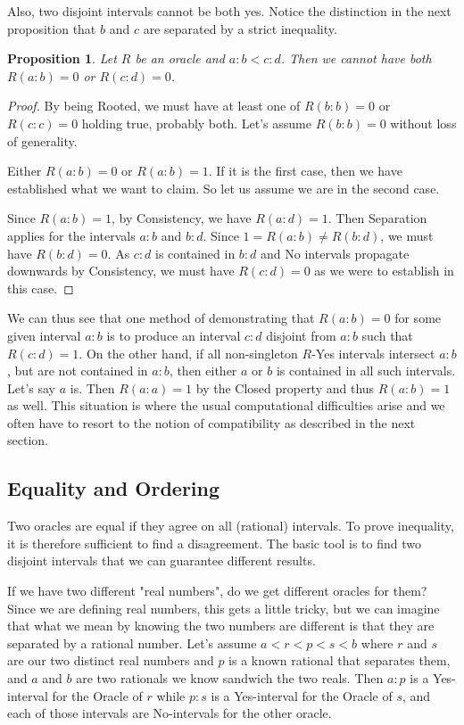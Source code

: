 \documentclass[12pt]{article}
\newtheorem{proposition}{Proposition}
\theoremstyle{remark}
\begin{document}
Also, two disjoint intervals cannot be both yes. Notice the distinction in the next proposition that $b$ and $c$ are separated by a strict inequality. 

\begin{proposition} \label{pr:disjoint}
Let $R$ be an oracle and $a:b < c:d$. Then we cannot have both $R(a:b) = 0$ or $R(c:d) = 0$. 
\end{proposition}

\begin{proof}
By being Rooted, we must have at least one of $R(b:b) = 0$ or $R(c:c) = 0$ holding true, probably both. Let's assume $R(b:b) = 0$ without loss of generality.
 
Either $R(a:b) = 0$ or $R(a:b)=1$. If it is the first case, then we have established what we want to claim. So let us assume we are in the second case. 
 
Since $R(a:b) = 1$,  by Consistency, we have $R(a:d) = 1$. Then Separation applies for the intervals $a:b$ and $b:d$. Since $1 = R(a:b) \neq R(b:d)$, we must have $R(b:d) = 0$. As $c:d$ is contained in $b:d$ and No intervals propagate downwards by Consistency, we must have $R(c:d)=0$  as we were to establish in this case. 
\end{proof}

We can thus see that one method of demonstrating that $R(a:b)=0$ for some given interval $a:b$ is to produce an interval $c:d$ disjoint from $a:b$ such that $R(c:d)=1$. On the other hand, if all non-singleton $R$-Yes intervals intersect $a:b$, but are not contained in $a:b$, then either $a$ or $b$ is contained in all such intervals. Let's say $a$ is. Then $R(a:a)=1$ by the Closed property and thus $R(a:b)=1$ as well. This situation is where the usual computational difficulties arise and we often have to resort to the notion of compatibility as described in the next section. 

\subsection{Equality and Ordering}

Two oracles are equal if they agree on all (rational) intervals. To prove inequality, it is therefore sufficient to find a disagreement. The basic tool is to find two disjoint intervals that we can guarantee different results. 

If we have two different "real numbers", do we get different oracles for them? Since we are defining real numbers, this gets a little tricky, but we can imagine that what we mean by knowing the two numbers are different is that they are separated by a rational number. Let's assume $a < r < p < s < b$ where $r$ and $s$ are our two distinct real numbers and $p$ is a known rational that separates them, and $a$ and $b$ are two rationals we know sandwich the two reals. Then $a:p$ is a Yes-interval for the Oracle of $r$ while $p:s$ is a Yes-interval for the Oracle of $s$, and each of those intervals are No-intervals for the other oracle. 
\end{document}

